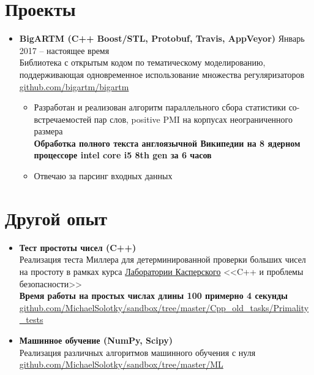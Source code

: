 \documentclass[letterpaper,11pt]{article}
\newcommand{\resumeSubHeadingListStart}{\begin{itemize}[leftmargin=*]}
\newcommand{\resumeSubHeadingListEnd}{\end{itemize}}
\begin{document}
\section{Проекты}
\resumeSubHeadingListStart
    \item{
      \textbf{{BigARTM}{ (C++ Boost/STL, Protobuf, Travis, AppVeyor)}}
      \hfill
      Январь 2017 -- настоящее время
    } \\
    Библиотека с открытым кодом по тематическому моделированию, поддерживающая одновременное использование множества регуляризаторов \\
    \faGithub \enspace \href{https://github.com/bigartm/bigartm}{\color{blue} github.com/bigartm/bigartm}
    \begin{itemize}
      \item Разработан и реализован алгоритм параллельного сбора статистики со-встречаемостей пар слов, positive PMI на корпусах неограниченного размера \\
      \textbf{Обработка полного текста англоязычной Википедии на 8 ядерном процессоре intel core i5 8th gen за 6 часов}
      \item Отвечаю за парсинг входных данных
    \end{itemize}

  \resumeSubHeadingListEnd


\section{Другой опыт}
  \resumeSubHeadingListStart
      \item{
        \textbf{{Тест простоты чисел}{ (C++) }} \\
        Реализация теста Миллера для детерминированной проверки больших чисел на простоту в рамках курса \href{https://www.kaspersky.com/}{\color{blue} Лаборатории Касперского} <<C++ и проблемы безопасности>> \\
        \textbf{Время работы на простых числах длины 100 примерно 4 секунды} \\
        \faGithub \enspace \href{https://github.com/MichaelSolotky/sandbox/tree/master/Cpp_old_tasks/Primality_tests}{\color{blue} github.com/MichaelSolotky/sandbox/tree/master/Cpp\_old\_tasks/Primality\_tests}
      }

      \item{
        \textbf{Машинное обучение (NumPy, Scipy)} \\
        Реализация различных алгоритмов машинного обучения с нуля \\
        \faGithub \enspace \href{https://github.com/MichaelSolotky/sandbox/tree/master/ML}{\color{blue} github.com/MichaelSolotky/sandbox/tree/master/ML}
      }
      \resumeSubHeadingListEnd
\end{document}
